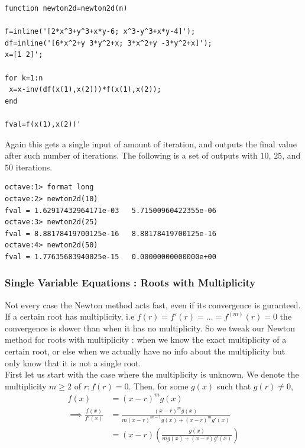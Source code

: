 \documentclass[paper=a4, fontsize=11pt]{scrartcl}
\begin{document}
\begin{lstlisting}[label=test.m,caption=newton2d.m]
function newton2d=newton2d(n)

f=inline('[2*x^3+y^3+x*y-6; x^3-y^3+x*y-4]');
df=inline('[6*x^2+y 3*y^2+x; 3*x^2+y -3*y^2+x]');
x=[1 2]';

for k=1:n
 x=x-inv(df(x(1),x(2)))*f(x(1),x(2));
end

fval=f(x(1),x(2))'
\end{lstlisting}
\vspace{0.15in}

Again this gets a single input of amount of iteration, and outputs the final value after such number of iterations. The following is a set of outputs with $10$, $25$, and $50$ iterations.

\begin{verbatim}
octave:1> format long
octave:2> newton2d(10)
fval = 1.62917432964171e-03   5.71500960422355e-06
octave:3> newton2d(25)
fval = 8.88178419700125e-16   8.88178419700125e-16
octave:4> newton2d(50)
fval = 1.77635683940025e-15   0.00000000000000e+00

\end{verbatim}

\subsubsection{Single Variable Equations : Roots with Multiplicity}
\vspace{0.15in}

Not every case the Newton method acts fast, even if its convergence is guranteed. If a certain root has multiplicity, i.e $f(r)=f'(r)= \dots = f^{(m)}(r)=0$ the convergence is slower than when it has no multiplicity. So we tweak our Newton method for roots with multiplicity : when we know the exact multiplicity of a certain root, or else when we actually have no info about the multiplicity but only know that it is not a single root.\\

First let us start with the case where the multiplicity is unknown. We denote the multiplicity $m \geq 2$ of $r:f(r)=0$. Then, for some $g(x)$ such that $g(r)\neq 0$, \\

\begin{equation}\nonumber
	\begin{split}
	f(x) &= (x-r)^m g(x) \\[2.5ex]
	\implies \frac{f(x)}{f'(x)} &= \frac{(x-r)^m g(x)}{m (x-r)^{m-1} g(x) + (x-r)^m g'(x)} \\[2.5ex]
	&= (x-r) \left( \frac{g(x)}{mg(x)+(x-r)g'(x)} \right) \\
	\end{split}
\end{equation}\\
\end{document}
